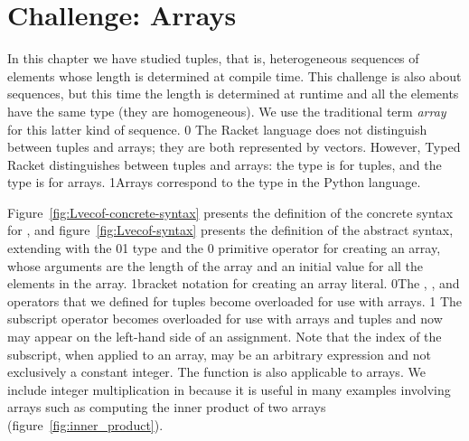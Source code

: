 \documentclass[7x10]{TimesAPriori_MIT}%
\def\racketEd{0}
\def\pythonEd{1}
\def\edition{1}
\newcommand{\racket}[1]{{\if\edition\racketEd{#1}\fi}}
\newcommand{\pythonColor}[0]{}
\newcommand{\python}[1]{{\if\edition\pythonEd\pythonColor #1\fi}}
\numberwithin{theorem}{chapter}
\numberwithin{definition}{chapter}
\numberwithin{equation}{chapter}
\begin{document}
\section{Challenge: Arrays}
\label{sec:arrays}


In this chapter we have studied tuples, that is, heterogeneous
sequences of elements whose length is determined at compile time. This
challenge is also about sequences, but this time the length is
determined at runtime and all the elements have the same type (they
are homogeneous). We use the traditional term \emph{array} for this
latter kind of sequence.
%
\racket{
The Racket language does not distinguish between tuples and arrays;
they are both represented by vectors. However, Typed Racket
distinguishes between tuples and arrays: the \code{Vector} type is for
tuples, and the \code{Vectorof} type is for arrays.}%
\python{Arrays correspond to the  type in the Python language.}

Figure~\ref{fig:Lvecof-concrete-syntax} presents the definition of the
concrete syntax for \LangArray{}, and figure~\ref{fig:Lvecof-syntax}
presents the definition of the abstract syntax, extending \LangVec{}
with the \racket{}\python{} type and the
\racket{ primitive operator for creating an array,
whose arguments are the length of the array and an initial value for
all the elements in the array.}%
\python{bracket notation for creating an array literal.}
\racket{The ,
, and \code{vector-ref!} operators that we defined
for tuples become overloaded for use with arrays.}
\python{
The subscript operator becomes overloaded for use with arrays and tuples
and now may appear on the left-hand side of an assignment.
Note that the index of the subscript, when applied to an array, may be an
arbitrary expression and not exclusively a constant integer.
The \code{len} function is also applicable to arrays.
}
%
We include integer multiplication in \LangArray{} because it is
useful in many examples involving arrays such as computing the
inner product of two arrays (figure~\ref{fig:inner_product}).

\newcommand{\LarrayGrammarRacket}{
\begin{array}{lcl}
  \Type &::=& \LP \key{Vectorof}~\Type \RP \\
  \Exp &::=& \CMUL{\Exp}{\Exp}
       \MID \CMAKEVEC{\Exp}{\Exp} 
\end{array}
}
\newcommand{\LarrayASTRacket}{
\begin{array}{lcl}
  \Type &::=& \LP \key{Vectorof}~\Type \RP \\
  \Exp &::=& \MUL{\Exp}{\Exp}
       \MID \MAKEVEC{\Exp}{\Exp} 
\end{array}
}
\end{document}
